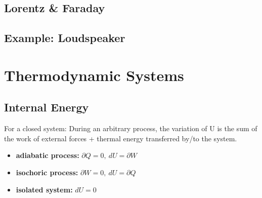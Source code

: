\documentclass[10pt,a4paper]{scrartcl}
\begin{document}
\begin{multicols*}{3}
\subsection{Lorentz \& Faraday}




\subsection{Example: Loudspeaker}








\section{Thermodynamic Systems}

\subsection{Internal Energy}


For a closed system: During an arbitrary process, the variation of U is the sum of the work of external forces + thermal energy transferred by/to the system.

\begin{itemize}
\item \textbf{adiabatic process:} $\partial Q = 0,\ dU=\partial W$
\item \textbf{isochoric process:} $\partial W=0,\ dU=\partial Q$
\item \textbf{isolated system:} $dU=0$
\end{itemize}


\end{multicols*}
\end{document}
